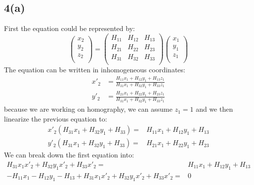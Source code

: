 \documentclass{article}
\begin{document}
\subsection*{4(a)}
First the equation could be represented by:
\begin{equation*}
\begin{pmatrix}
x_2\\
y_2\\
z_2\\
\end{pmatrix} =
\begin{pmatrix}
H_{11} & H_{12} & H_{13} \\
H_{21} & H_{22} & H_{23} \\
H_{31} & H_{32} & H_{33} \\
\end{pmatrix}
\begin{pmatrix}
x_1\\
y_1\\
z_1\\
\end{pmatrix}
\end{equation*}
The equation can be written in inhomogeneous coordinates:
\begin{equation*}
\begin{aligned}
x'_2 &= \frac{H_{11}x_1 + H_{12}y_1 + H_{13}z_1}{H_{31}x_1 + H_{32}y_1 + H_{33}z_1}\\
y'_2 &= \frac{H_{21}x_1 + H_{22}y_1 + H_{23}z_1}{H_{31}x_1 + H_{32}y_1 + H_{33}z_1}
\end{aligned}
\end{equation*}
because we are working on homography, we can assume $z_1 = 1$ and we then linearize the previous equation to:
\begin{equation*}
\begin{aligned}
x'_2(H_{31}x_1 + H_{32}y_1 + H_{33}) =& H_{11}x_1 + H_{12}y_1 + H_{13}\\
y'_2(H_{31}x_1 + H_{32}y_1 + H_{33}) =& H_{21}x_1 + H_{22}y_1 + H_{23}
\end{aligned}
\end{equation*}
We can break down the first equation into:
\begin{equation*}
\begin{aligned}
H_{31}x_1x'_2 + H_{32}y_1x'_2 + H_{33}x'_2 =& H_{11}x_1 + H_{12}y_1 + H_{13}\\
-H_{11}x_1 - H_{12}y_1 - H_{13} + H_{31}x_1x'_2 + H_{32}y_1x'_2 + H_{33}x'_2 =& 0
\end{aligned}
\end{equation*}
\end{document}
